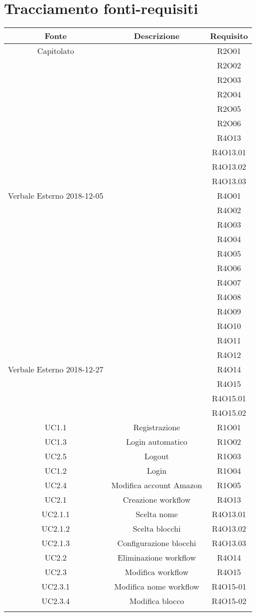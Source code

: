 \section{Tracciamento fonti-requisiti}
\begin{tabularx}{\textwidth}{|C|C|C|}
	\hline
	\textbf{Fonte} &\textbf{Descrizione} & \textbf{Requisito} \\
	\hline
	\endhead
	Capitolato& &R2O01\\&&R2O02\\&&R2O03\\&&R2O04\\&&R2O05\\&&R2O06\\&&R4O13\\&&R4O13.01\\&&R4O13.02\\&&R4O13.03\\
	\hline
	Verbale Esterno 2018-12-05&&R4O01\\&&R4O02\\&&R4O03\\&&R4O04\\&&R4O05\\&&R4O06\\&&R4O07\\&&R4O08\\&&R4O09\\&&R4O10\\&&R4O11\\&&R4O12\\
	\hline
	Verbale Esterno 2018-12-27&&R4O14\\&&R4O15\\&&R4O15.01\\&&R4O15.02\\
	\hline
	UC1.1  &Registrazione &R1O01\\
	\hline
	UC1.3  &Login automatico&R1O02\\
	\hline
	UC2.5   &Logout&R1O03\\
	\hline
	UC1.2 &Login&R1O04\\
	\hline
	UC2.4 &Modifica account Amazon&R1O05\\
	\hline
	UC2.1 &Creazione workflow&R4O13\\
	\hline
	UC2.1.1 &Scelta nome&R4O13.01\\
	\hline
	UC2.1.2 &Scelta blocchi&R4O13.02\\
	\hline
	UC2.1.3 &Configurazione blocchi&R4O13.03\\
	\hline
	UC2.2 &Eliminazione workflow&R4O14\\
	\hline
	UC2.3 &Modifica workflow&R4O15\\
	\hline	
	UC2.3.1 &Modifica nome workflow&R4O15-01\\
	\hline
	UC2.3.4 &Modifica blocco&R4O15-02\\
	\hline
	\caption{Tabella fonti-requisiti}
\end{tabularx}